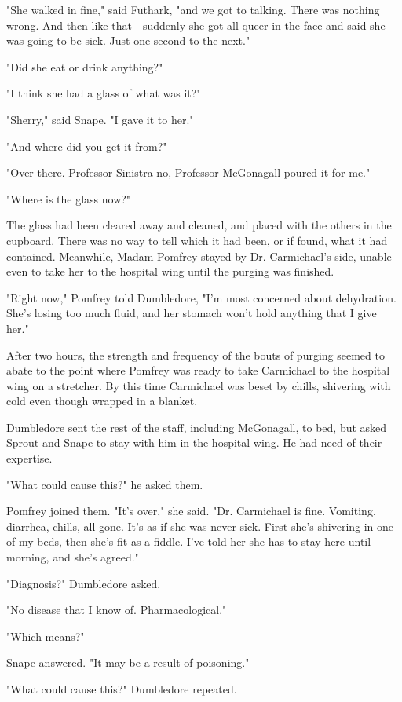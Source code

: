 "She walked in fine," said Futhark, "and we got to talking. There was nothing wrong. And then like that—suddenly she got all queer in the face and said she was going to be sick. Just one second to the next."

"Did she eat or drink anything?"

"I think she had a glass of{\el} what was it?"

"Sherry," said Snape. "I gave it to her."

"And where did you get it from?"

"Over there. Professor Sinistra{\el} no, Professor McGonagall poured it for me."

"Where is the glass now?"

The glass had been cleared away and cleaned, and placed with the others in the cupboard. There was no way to tell which it had been, or if found, what it had contained. Meanwhile, Madam Pomfrey stayed by Dr. Carmichael's side, unable even to take her to the hospital wing until the purging was finished.

"Right now," Pomfrey told Dumbledore, "I'm most concerned about dehydration. She's losing too much fluid, and her stomach won't hold anything that I give her."

After two hours, the strength and frequency of the bouts of purging seemed to abate to the point where Pomfrey was ready to take Carmichael to the hospital wing on a stretcher. By this time Carmichael was beset by chills, shivering with cold even though wrapped in a blanket.

Dumbledore sent the rest of the staff, including McGonagall, to bed, but asked Sprout and Snape to stay with him in the hospital wing. He had need of their expertise.

"What could cause this?" he asked them.

Pomfrey joined them. "It's over," she said. "Dr. Carmichael is fine. Vomiting, diarrhea, chills, all gone. It's as if she was never sick. First she's shivering in one of my beds, then she's fit as a fiddle. I've told her she has to stay here until morning, and she's agreed."

"Diagnosis?" Dumbledore asked.

"No disease that I know of. Pharmacological."

"Which means?"

Snape answered. "It may be a result of poisoning."

"What could cause this?" Dumbledore repeated.

